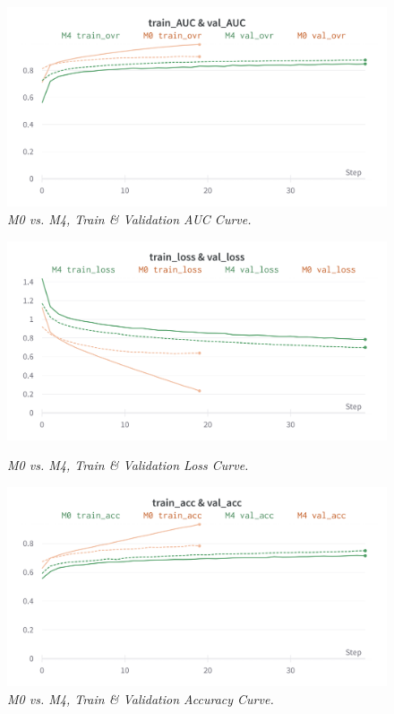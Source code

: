 \begin{figure}[H]
  \centering
  \includegraphics[width=\textwidth]{imatges/results/AUCM0M4.png}
  \caption[M0 vs. M4, Train \& Validation AUC Curve]{\textit{M0 vs. M4, Train \& Validation AUC Curve. }}
\end{figure}

\newpage

\begin{figure}[H]
  \centering
  \includegraphics[width=\textwidth]{imatges/results/LossM0M4.png}
  \caption[M0 vs. M4, Train \& Validation Loss Curve]{\textit{M0 vs. M4, Train \& Validation Loss Curve. }}
  {\label{fig:lossm0m4}}
\end{figure}

\begin{figure}[H]
  \centering
  \includegraphics[width=\textwidth]{imatges/results/AccM0M4.png}
  \caption[M0 vs. M4, Train \& Validation Accuracy Curve]{\textit{M0 vs. M4, Train \& Validation Accuracy Curve. }}
\end{figure}

